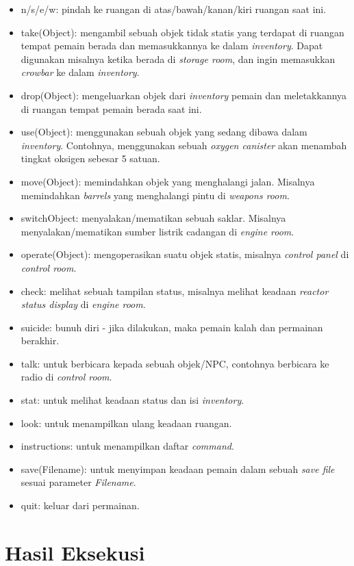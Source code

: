 \documentclass[a4paper,titlepage]{article}
\begin{document}
		\begin{itemize}
			\item n/s/e/w: pindah ke ruangan di atas/bawah/kanan/kiri ruangan saat ini.
			\item take(Object): mengambil sebuah objek tidak statis yang terdapat di ruangan tempat pemain berada dan memasukkannya ke dalam \textit{inventory}. Dapat digunakan misalnya ketika berada di \textit{storage room}, dan ingin memasukkan \textit{crowbar} ke dalam \textit{inventory}.
			\item drop(Object): mengeluarkan objek dari \textit{inventory} pemain dan meletakkannya di ruangan tempat pemain berada saat ini.
			\item use(Object): menggunakan sebuah objek yang sedang dibawa dalam \textit{inventory}. Contohnya, menggunakan sebuah \textit{oxygen canister} akan menambah tingkat oksigen sebesar 5 satuan.
			\item move(Object): memindahkan objek yang menghalangi jalan. Misalnya memindahkan \textit{barrels} yang menghalangi pintu di \textit{weapons room}.
			\item switch{Object}: menyalakan/mematikan sebuah saklar. Misalnya menyalakan/mematikan sumber listrik cadangan di \textit{engine room}.
			\item operate(Object): mengoperasikan suatu objek statis, misalnya \textit{control panel} di \textit{control room}.
			\item check: melihat sebuah tampilan status, misalnya melihat keadaan \textit{reactor status display} di \textit{engine room}.
			\item suicide: bunuh diri - jika dilakukan, maka pemain kalah dan permainan berakhir.
			\item talk: untuk berbicara kepada sebuah objek/NPC, contohnya berbicara ke radio di \textit{control room}.
			\item stat: untuk melihat keadaan status dan isi \textit{inventory}.
			\item look: untuk menampilkan ulang keadaan ruangan.
			\item instructions: untuk menampilkan daftar \textit{command}.
			\item save(Filename): untuk menyimpan keadaan pemain dalam sebuah \textit{save file} sesuai parameter \textit{Filename}.
			\item quit: keluar dari permainan.

		\end{itemize}

	\section{Hasil Eksekusi}
\end{document}
